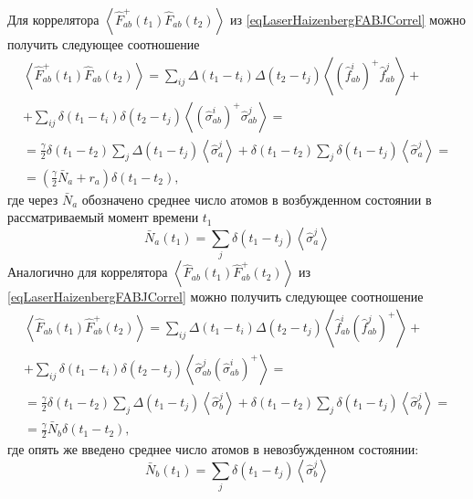 Для коррелятора 
$\left<\hat{F}_{ab}^{+}\left(t_1\right)\hat{F}_{ab}\left(t_2\right)\right>$
из \eqref{eqLaserHaizenbergFABJCorrel} можно получить следующее
соотношение
\begin{eqnarray}
\left<\hat{F}_{ab}^{+}\left(t_1\right)\hat{F}_{ab}\left(t_2\right)\right>
= \sum_{ij}\Delta\left(t_1 - t_i\right)\Delta\left(t_2 -
t_j\right)\left<\left(\hat{f}^{i}_{ab}\right)^{+}\hat{f}^{j}_{ab}\right>
+
\nonumber \\
+ 
\sum_{ij} \delta\left(t_1 - t_i\right)\delta\left(t_2 - t_j\right)
\left<\left(\hat{\sigma}^{i}_{ab}\right)^{+}\hat{\sigma}^{j}_{ab}\right>
= 
\nonumber \\
=
\frac{\gamma}{2}\delta\left(t_1 - t_2\right)\sum_{j}\Delta\left(t_1 -
t_j\right)\left<\hat{\sigma}^{j}_{a}\right> +
\delta\left(t_1 - t_2\right) \sum_{j} \delta\left(t_1 - t_j\right)
\left<\hat{\sigma}^{j}_{a}\right> 
=
\nonumber \\
= 
\left(
\frac{\gamma}{2}\bar{N}_a + r_a
\right)\delta\left(t_1 - t_2\right),
\label{eqLaserHaizenbergFABCorrel_1}
\end{eqnarray}
где через $\bar{N}_a$ обозначено среднее число атомов в возбужденном
состоянии в рассматриваемый момент времени $t_1$
\begin{equation}
\bar{N}_a\left(t_1\right) = \sum_{j} \delta\left(t_1 - t_j\right)
\left<\hat{\sigma}^{j}_{a}\right>
\nonumber 
\end{equation}
Аналогично для коррелятора 
$\left<\hat{F}_{ab}\left(t_1\right)\hat{F}_{ab}^{+}\left(t_2\right)\right>$
из \eqref{eqLaserHaizenbergFABJCorrel} можно получить следующее
соотношение
\begin{eqnarray}
\left<\hat{F}_{ab}\left(t_1\right)\hat{F}_{ab}^{+}\left(t_2\right)\right>
= \sum_{ij}\Delta\left(t_1 - t_i\right)\Delta\left(t_2 -
t_j\right)\left<\hat{f}^{i}_{ab}\left(\hat{f}^{j}_{ab}\right)^{+}\right>
+
\nonumber \\
+ 
\sum_{ij} \delta\left(t_1 - t_i\right)\delta\left(t_2 - t_j\right)
\left<\hat{\sigma}^{j}_{ab}\left(\hat{\sigma}^{i}_{ab}\right)^{+}\right>
= 
\nonumber \\
=
\frac{\gamma}{2}\delta\left(t_1 - t_2\right)\sum_{j}\Delta\left(t_1 -
t_j\right)\left<\hat{\sigma}^{j}_{b}\right> +
\delta\left(t_1 - t_2\right) \sum_{j} \delta\left(t_1 - t_j\right)
\left<\hat{\sigma}^{j}_{b}\right> 
=
\nonumber \\
= 
\frac{\gamma}{2}\bar{N}_b\delta\left(t_1 - t_2\right),
\label{eqLaserHaizenbergFABCorrel_2}
\end{eqnarray}
где опять же введено среднее число атомов в невозбужденном состоянии:
\begin{equation}
\bar{N}_b\left(t_1\right) = \sum_{j} \delta\left(t_1 - t_j\right)
\left<\hat{\sigma}^{j}_{b}\right>
\nonumber 
\end{equation}

